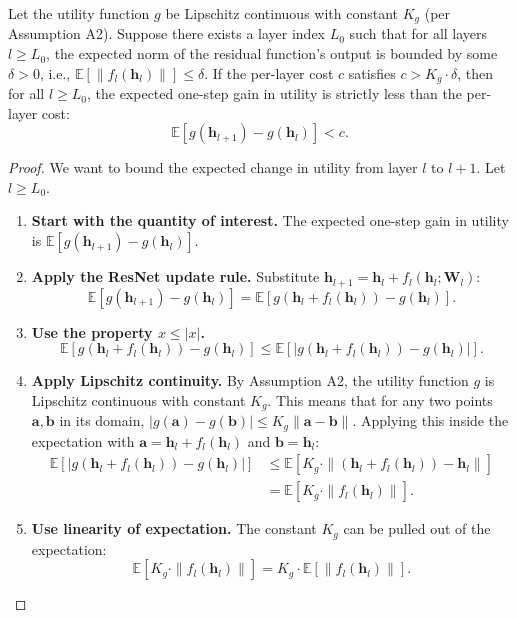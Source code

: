 \documentclass[10pt,a4paper]{amsart}
\newcommand{\E}{\mathbb{E}}
\newcommand{\W}{\mathbf{W}}
\newcommand{\h}{\mathbf{h}}
\begin{document}
\begin{proposition}
Let the utility function $g$ be Lipschitz continuous with constant $K_g$ (per Assumption A2). Suppose there exists a layer index $L_0$ such that for all layers $l \ge L_0$, the expected norm of the residual function's output is bounded by some $\delta > 0$, i.e., $\E[\|f_l(\h_l)\|] \le \delta$. If the per-layer cost $c$ satisfies $c > K_g \cdot \delta$, then for all $l \ge L_0$, the expected one-step gain in utility is strictly less than the per-layer cost:
\begin{equation}
\E[g(\h_{l+1}) - g(\h_l)] < c.
\end{equation}
\end{proposition}

\begin{proof}
We want to bound the expected change in utility from layer $l$ to $l+1$. Let $l \ge L_0$.
\begin{enumerate}
    \item \textbf{Start with the quantity of interest.} The expected one-step gain in utility is $\E[g(\h_{l+1}) - g(\h_l)]$.

    \item \textbf{Apply the ResNet update rule.} Substitute $\h_{l+1} = \h_l + f_l(\h_l; \W_l)$:
    \[ \E[g(\h_{l+1}) - g(\h_l)] = \E[g(\h_l + f_l(\h_l)) - g(\h_l)]. \]

    \item \textbf{Use the property $x \le |x|$.}
    \[ \E[g(\h_l + f_l(\h_l)) - g(\h_l)] \le \E\left[ \left| g(\h_l + f_l(\h_l)) - g(\h_l) \right| \right]. \]

    \item \textbf{Apply Lipschitz continuity.} By Assumption A2, the utility function $g$ is Lipschitz continuous with constant $K_g$. This means that for any two points $\mathbf{a}, \mathbf{b}$ in its domain, $|g(\mathbf{a}) - g(\mathbf{b})| \le K_g \|\mathbf{a} - \mathbf{b}\|$. Applying this inside the expectation with $\mathbf{a} = \h_l + f_l(\h_l)$ and $\mathbf{b} = \h_l$:
    \begin{align*}
    \E\left[ \left| g(\h_l + f_l(\h_l)) - g(\h_l) \right| \right] &\le \E[K_g \cdot \|(\h_l + f_l(\h_l)) - \h_l\|] \\
    &= \E[K_g \cdot \|f_l(\h_l)\|].
    \end{align*}

    \item \textbf{Use linearity of expectation.} The constant $K_g$ can be pulled out of the expectation:
    \[ \E[K_g \cdot \|f_l(\h_l)\|] = K_g \cdot \E[\|f_l(\h_l)\|]. \]


\end{enumerate}
\end{proof}
\end{document}
